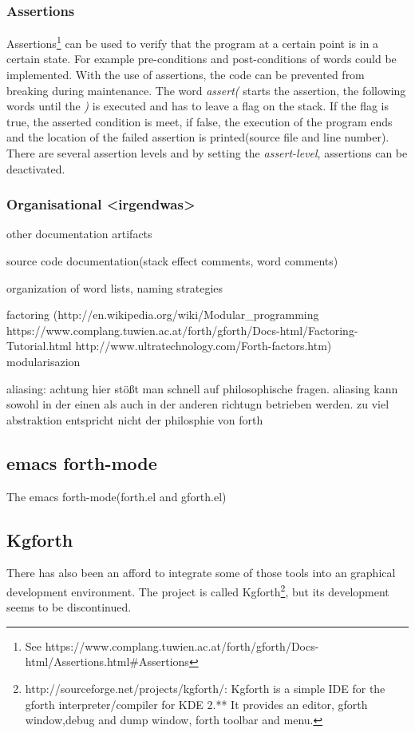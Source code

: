 \subsubsection*{Assertions}
Assertions\footnote{See https://www.complang.tuwien.ac.at/forth/gforth/Docs-html/Assertions.html\#Assertions} can be used to verify that the program at a certain point is in a certain state. For example pre-conditions and post-conditions of words could be implemented. With the use of assertions, the code can be prevented from breaking during maintenance. The word \emph{assert(} starts the assertion, the following words until the \emph{)} is executed and has to leave a flag on the stack. If the flag is true, the asserted condition is meet, if false, the execution of the program ends and the location of the failed assertion is printed(source file and line number).\\
There are several assertion levels and by setting the \emph{assert-level}, assertions can be deactivated.

\subsubsection*{Organisational <irgendwas>}

other documentation artifacts

source code documentation(stack effect comments, word comments)

organization of word lists, naming strategies

factoring (http://en.wikipedia.org/wiki/Modular\_programming https://www.complang.tuwien.ac.at/forth/gforth/Docs-html/Factoring-Tutorial.html http://www.ultratechnology.com/Forth-factors.htm)
modularisazion

aliasing: achtung hier stößt man schnell auf philosophische fragen. aliasing kann sowohl in der einen als auch in der anderen richtugn betrieben werden. zu viel abstraktion entspricht nicht der philosphie von forth
	


\subsection{emacs forth-mode}

The emacs forth-mode(forth.el and gforth.el)

\subsection{Kgforth}

There has also been an afford to integrate some of those tools into an graphical development environment. The project is called Kgforth\footnote{http://sourceforge.net/projects/kgforth/: Kgforth is a simple IDE for the gforth interpreter/compiler for KDE 2.** 
It provides an editor, gforth window,debug and dump window, forth toolbar and menu.}, but its development seems to be discontinued.